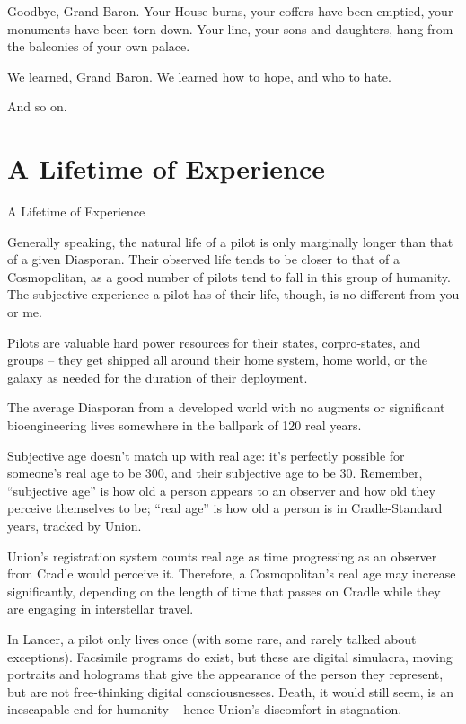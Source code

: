 Goodbye, Grand Baron. Your House burns, your coffers have been emptied, your monuments  
have been torn down. Your line, your sons and daughters, hang from the balconies of your own  
palace.   

We learned, Grand Baron. We learned how to hope, and who to hate.  

And so on.   
\section{A Lifetime of Experience}
A Lifetime of Experience  

Generally speaking, the natural life of a pilot is only marginally longer than that of a given  
Diasporan. Their observed life tends to be closer to that of a Cosmopolitan, as a good number of  
pilots tend to fall in this group of humanity. The subjective experience a pilot has of their life,  
though, is no different from you or me. 
 

Pilots are valuable hard power resources for their states, corpro-states, and groups -- they get  
shipped all around their home system, home world, or the galaxy as needed for the duration of  
their deployment. 
 

The average Diasporan from a developed world with no augments or significant bioengineering  
lives somewhere in the ballpark of 120 real years. 
 

Subjective age doesn’t match up with real age: it’s perfectly possible for someone’s real age to  
be 300, and their subjective age to be 30. Remember, “subjective age” is how old a person  
appears to an observer and how old they perceive themselves to be; “real age” is how old a  
person is in Cradle-Standard years, tracked by Union. 
 

                                                                                                           


Union’s registration system counts real age as time progressing as an observer from Cradle  
would perceive it. Therefore, a Cosmopolitan’s real age may increase significantly, depending on  
the length of time that passes on Cradle while they are engaging in interstellar travel.  
 

In Lancer, a pilot only lives once (with some rare, and rarely talked about exceptions). Facsimile  
programs do exist, but these are digital simulacra, moving portraits and holograms that give the  
appearance of the person they represent, but are not free-thinking digital consciousnesses.  
Death, it would still seem, is an inescapable end for humanity -- hence Union’s discomfort in  
stagnation. 
 
